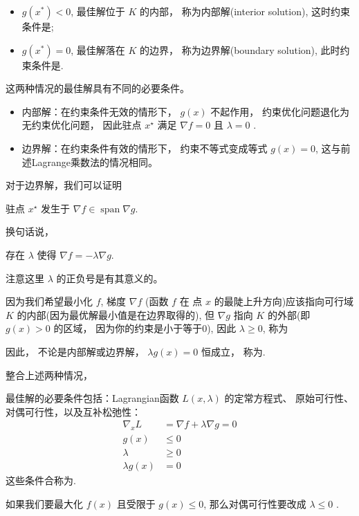 \begin{itemize}
    \item $ g\left({x}^{*}\right)<0 $, 最佳解位于 $ K $ 的内部， 称为内部解(interior solution), 这时约束条件是;
    \item $ g\left({x}^{*}\right)=0 $, 最佳解落在 $ K $ 的边界， 称为边界解(boundary solution), 此时约束条件是.
\end{itemize}

这两种情况的最佳解具有不同的必要条件。

\begin{itemize}
    \item 内部解：在约束条件无效的情形下， $ g({x}) $ 不起作用， 约束优化问题退化为无约束优化问题， 因此驻点 $ {x}^{\star} $ 满足 $ \nabla f={0} $ 且 $ \lambda=0 $ .
    \item 边界解：在约束条件有效的情形下， 约束不等式变成等式 $g({x})=0$, 这与前述Lagrange乘数法的情况相同。
\end{itemize}

对于边界解，我们可以证明

\begin{theorem}
    驻点 ${x}^{\star}$ 发生于 $\nabla f \in \operatorname{span} \nabla g$.
\end{theorem}
换句话说， 

\begin{corollary}
    存在 $\lambda$ 使得 $\nabla f=-\lambda \nabla g$.

    注意这里 $\lambda$ 的正负号是有其意义的。
\end{corollary}

因为我们希望最小化 $f$, 梯度 $\nabla f$ (函数 $f$ 在 点 ${x}$ 的最陡上升方向)应该指向可行域 $K$ 的内部(因为最优解最小值是在边界取得的), 但 $\nabla g$ 指向 $K$ 的外部(即 $g({x})>0$ 的区域， 因为你的约束是小于等于0), 因此 $\lambda \geq 0$, 称为

因此， 不论是内部解或边界解， $\lambda g({x})=0$ 恒成立， 称为.

整合上述两种情况， 

\begin{theorem}
    最佳解的必要条件包括：Lagrangian函数 $L({x}, \lambda)$ 的定常方程式、 原始可行性、对偶可行性，以及互补松弛性：
\begin{equation}
\begin{aligned}
\nabla_{{x}} L &=\nabla f+\lambda \nabla g={0} \\
g({x}) & \leq 0 \\
\lambda & \geq 0 \\
\lambda g({x}) &=0
\end{aligned}
\end{equation}
这些条件合称为.

如果我们要最大化 $f({x})$ 且受限于 $g({x}) \leq 0$, 那么对偶可行性要改成 $\lambda \leq 0$ .
\end{theorem}



